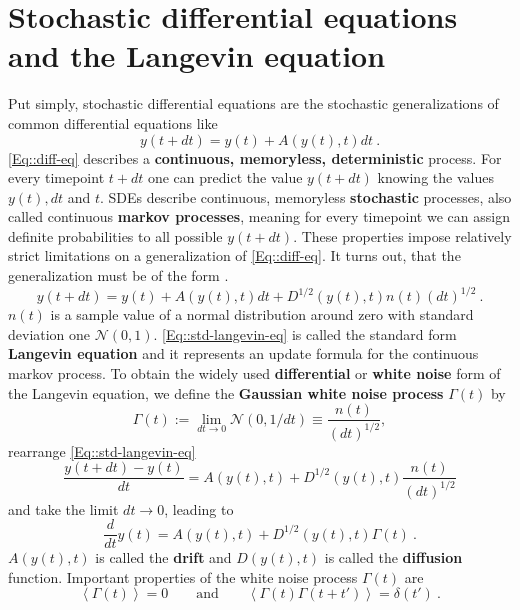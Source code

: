 	\section{Stochastic differential equations and the Langevin equation}
	Put simply, stochastic differential equations are the stochastic generalizations of common differential equations like
	\begin{equation} \label{Eq::diff-eq}
		y(t + dt) =	y(t) + A(y(t), t) dt ~.
	\end{equation}
	\autoref{Eq::diff-eq} describes a \textbf{continuous, memoryless, deterministic} process. For every timepoint $t + dt$ one can predict the value $y(t+dt)$ knowing the values $y(t), dt $ and $t$. SDEs describe continuous, memoryless \textbf{stochastic} processes, also called continuous \textbf{markov processes}, meaning for every timepoint we can assign definite probabilities to all possible $y(t + dt)$. These properties impose relatively strict limitations on a generalization of \autoref{Eq::diff-eq}. It turns out, that the generalization must be of the form \cite{gillespie1996mathematics}.
	\begin{equation} \label{Eq::std-langevin-eq}
		y(t + dt) =	y(t) + A(y(t), t) dt + D^{1/2} \left(y(t), t\right) n(t) (dt)^{1/2}~.
	\end{equation}
	$n(t)$ is a sample value of a normal distribution around zero with standard deviation one $\mathcal{N}(0,1)$. \autoref{Eq::std-langevin-eq} is called the standard form \textbf{Langevin equation} and it represents an update formula for the continuous markov process. To obtain the widely used \textbf{differential }or \textbf{white noise }form of the Langevin equation, we define the \textbf{Gaussian white noise process} $\Gamma(t)$ by
	\begin{equation}
		\Gamma(t) :=	\lim\limits_{dt \rightarrow 0} \mathcal{N}(0, 1/dt) \equiv \frac{n(t)}{(dt)^{1/2}},
	\end{equation}
	rearrange \autoref{Eq::std-langevin-eq}
	\begin{equation}
		\frac{y(t + dt) - y(t)}{dt} =	A(y(t), t) + D^{1/2} (y(t), t) \frac{n(t)}{(dt)^{1/2}}
	\end{equation}
	and take the limit $dt \rightarrow 0$, leading to
	\begin{equation} \label{Eq::Differential-Langevin-eq}
		\frac{d}{dt} y(t) =	A(y(t), t) + D^{1/2}(y(t), t) \Gamma(t)~.
	\end{equation}
	$A(y(t), t)$ is called the \textbf{drift} and $D(y(t), t)$ is called the \textbf{diffusion} function. Important properties of the white noise process $\Gamma(t)$ are
	\begin{equation}
		\left \langle \Gamma(t) \right \rangle = 0 \qquad \text{and} \qquad  			\left \langle \Gamma(t) \Gamma(t + t')\right \rangle =	\delta(t') ~.
	\end{equation} 
	
